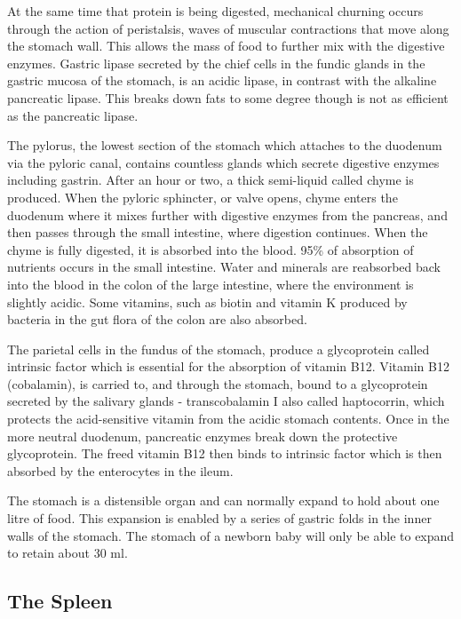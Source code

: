 At the same time that protein is being digested, mechanical churning occurs through the action of peristalsis, waves of muscular contractions that move along the stomach wall. This allows the mass of food to further mix with the digestive enzymes. Gastric lipase secreted by the chief cells in the fundic glands in the gastric mucosa of the stomach, is an acidic lipase, in contrast with the alkaline pancreatic lipase. This breaks down fats to some degree though is not as efficient as the pancreatic lipase.

The pylorus, the lowest section of the stomach which attaches to the duodenum via the pyloric canal, contains countless glands which secrete digestive enzymes including gastrin. After an hour or two, a thick semi-liquid called chyme is produced. When the pyloric sphincter, or valve opens, chyme enters the duodenum where it mixes further with digestive enzymes from the pancreas, and then passes through the small intestine, where digestion continues. When the chyme is fully digested, it is absorbed into the blood. 95\% of absorption of nutrients occurs in the small intestine. Water and minerals are reabsorbed back into the blood in the colon of the large intestine, where the environment is slightly acidic. Some vitamins, such as biotin and vitamin K produced by bacteria in the gut flora of the colon are also absorbed.

The parietal cells in the fundus of the stomach, produce a glycoprotein called intrinsic factor which is essential for the absorption of vitamin B12. Vitamin B12 (cobalamin), is carried to, and through the stomach, bound to a glycoprotein secreted by the salivary glands - transcobalamin I also called haptocorrin, which protects the acid-sensitive vitamin from the acidic stomach contents. Once in the more neutral duodenum, pancreatic enzymes break down the protective glycoprotein. The freed vitamin B12 then binds to intrinsic factor which is then absorbed by the enterocytes in the ileum.

The stomach is a distensible organ and can normally expand to hold about one litre of food. This expansion is enabled by a series of gastric folds in the inner walls of the stomach. The stomach of a newborn baby will only be able to expand to retain about 30 ml.

\hypertarget{the-spleen-1}{%
\subsection{The Spleen}\label{the-spleen-1}}


